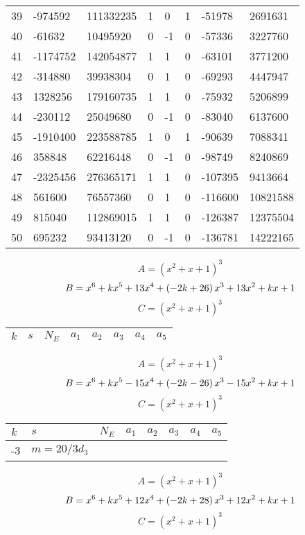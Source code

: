 \documentclass{amsart}
\begin{document}
\begin{longtable}{|l|l|l|lllll|}
39&-974592&111332235&1&0&1&-51978&2691631\\
40&-61632&10495920&0&-1&0&-57336&3227760\\
41&-1174752&142054877&1&1&0&-63101&3771200\\
42&-314880&39938304&0&1&0&-69293&4447947\\
43&1328256&179160735&1&1&0&-75932&5206899\\
44&-230112&25049680&0&-1&0&-83040&6137600\\
45&-1910400&223588785&1&0&1&-90639&7088341\\
46&358848&62216448&0&-1&0&-98749&8240869\\
47&-2325456&276365171&1&1&0&-107395&9413664\\
48&561600&76557360&0&1&0&-116600&10821588\\
49&815040&112869015&1&1&0&-126387&12375504\\
50&695232&93413120&0&-1&0&-136781&14222165\\
\hline
\end{longtable}
$$A=(x^2
 + x
 + 1)^{3}$$
$$B=x^6
 + k\*x^5
 + 13\*x^4
 + \left(-2\*k
 + 26\right) \*x^3
 + 13\*x^2
 + k\*x
 + 1$$
$$C=(x^2
 + x
 + 1)^{3}$$
\begin{longtable}{|l|l|l|lllll|}
\hline
$k$ & $s$ & $N_E$ & $a_1$ & $a_2$ & $a_3$ & $a_4$ & $a_5$\\
\hline
\hline
\end{longtable}
$$A=(x^2
 + x
 + 1)^{3}$$
$$B=x^6
 + k\*x^5
 - 15\*x^4
 + \left(-2\*k
 - 26\right) \*x^3
 - 15\*x^2
 + k\*x
 + 1$$
$$C=(x^2
 + x
 + 1)^{3}$$
\begin{longtable}{|l|l|l|lllll|}
\hline
$k$ & $s$ & $N_E$ & $a_1$ & $a_2$ & $a_3$ & $a_4$ & $a_5$\\
\hline
-3&$m=20/3d_{3}$&&\multicolumn{5}{c|}{}\\
\hline
\end{longtable}
$$A=(x^2
 + x
 + 1)^{3}$$
$$B=x^6
 + k\*x^5
 + 12\*x^4
 + \left(-2\*k
 + 28\right) \*x^3
 + 12\*x^2
 + k\*x
 + 1$$
$$C=(x^2
 + x
 + 1)^{3}$$
\end{document}
